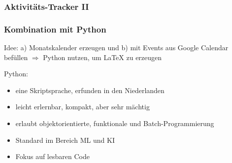 \documentclass[12pt,ngerman]{beamer}
\begin{document}
\begin{frame}[containsverbatim]
\frametitle{Aktivitäts-Tracker II}

\begin{center}
\end{center}

\end{frame}


\begin{frame}[containsverbatim]
\frametitle{Kombination mit Python}

Idee: a) Monatskalender erzeugen und b) mit Events aus Google Calendar befüllen $\Rightarrow$ Python nutzen, um LaTeX zu erzeugen

Python: 
\begin{itemize}
\item eine Skriptsprache, erfunden in den Niederlanden
\item leicht erlernbar, kompakt, aber sehr mächtig
\item erlaubt objektorientierte, funktionale und Batch-Programmierung
\item Standard im Bereich ML und KI
\item Fokus auf lesbaren Code
\end{itemize}


\end{frame}
\end{document}
